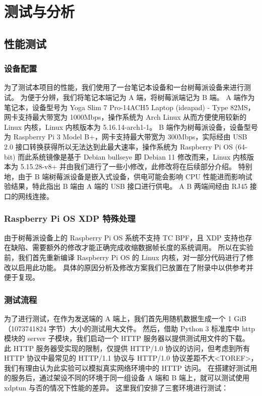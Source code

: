

\chapter{测试与分析}

\section{性能测试}

\subsection{设备配置}

为了测试本项目的性能，我们使用了一台笔记本设备和一台树莓派设备来进行测试。
为便于分辨，我们将笔记本端记为 A 端，将树莓派端记为 B 端。
A 端作为笔记本，设备型号为 Yoga Slim 7 Pro-14ACH5 Laptop (ideapad) - Type 82MS，网卡支持最大带宽为 1000Mbps，操作系统为 Arch Linux 从而方便使用较新的 Linux 内核，Linux 内核版本为 5.16.14-arch1-1。
B 端作为树莓派设备，设备型号为 Raspberry Pi 3 Model B+，网卡支持最大带宽为 300Mbps，实际经由 USB 2.0 接口转换获得所以无法达到此最大速率，操作系统为 Raspberry Pi OS (64-bit) 而此系统镜像是基于 Debian bullseye 即 Debian 11 修改而来，Linux 内核版本为 5.15.28-v8+ 并由我们进行了一些小修改，此修改将在后续部分介绍。
特别地，由于 B 端树莓派设备是嵌入式设备，供电可能会影响 CPU 性能进而影响试验结果，特此指出 B 端由 A 端的 USB 接口进行供电。
A B 两端间经由 RJ45 接口的网线连接。

\subsection{Raspberry Pi OS XDP 特殊处理}

由于树莓派设备上的 Raspberry Pi OS 系统不支持 TC BPF，且 XDP 支持也存在缺陷、需要额外的修改才能正确完成收缩数据帧长度的系统调用。
所以在实验前，我们首先重新编译 Raspberry Pi OS 的 Linux 内核，对一部分代码进行了修改以启用此功能。
具体的原因分析及修改方案我们已放置在了附录中以供参考并便于复现。

\subsection{测试流程}

为了进行测试，在作为发送端的 A 端上，我们首先用随机数据生成一个 1 GiB（1073741824 字节）大小的测试用大文件。
然后，借助 Python 3 标准库中 http 模块的 server 子模块，我们启动一个 HTTP 服务器以提供测试用文件的下载。
此 HTTP 服务器受实现的限制，仅提供 HTTP/1.0 协议的访问，但考虑到所有 HTTP 协议中最常见的 HTTP/1.1 协议与 HTTP/1.0 协议差距不大<TOREF>，我们有理由认为此实验可以模拟真实网络环境中的 HTTP 访问。
在搭建好测试用的服务后，通过架设不同的环境于同一组设备 A 端和 B 端上，就可以测试使用 xdptun 与否的情况下性能的差异。
这里我们安排了三套环境进行测试：

